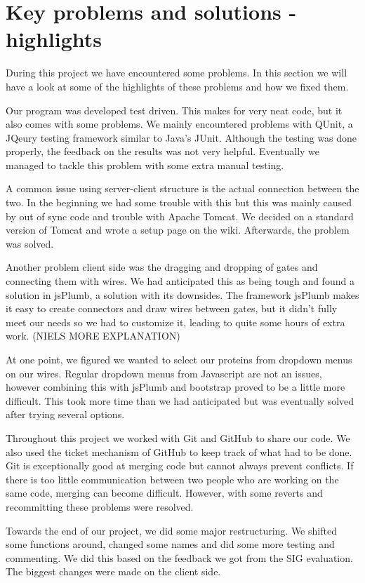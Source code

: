 \documentclass[a4paper]{article}
\begin{document}
\section{Key problems and solutions - highlights}

During this project we have encountered some problems. In this section we will have a look at some of the highlights of these problems and how we fixed them.

Our program was developed test driven. This makes for very neat code, but it also comes with some problems. We mainly encountered problems with QUnit, a JQeury testing framework similar to Java's JUnit. Although the testing was done properly, the feedback on the results was not very helpful. Eventually we managed to tackle this problem with some extra manual testing.

A common issue using server-client structure is the actual connection between the two. In the beginning we had some trouble with this but this was mainly caused by out of sync code and trouble with Apache Tomcat. We decided on a standard version of Tomcat and wrote a setup page on the wiki. Afterwards, the problem was solved.

Another problem client side was the dragging and dropping of gates and connecting them with wires. We had anticipated this as being tough and found a solution in jsPlumb, a solution with its downsides. The framework jsPlumb makes it easy to create connectors and draw wires between gates, but it didn't fully meet our needs so we had to customize it, leading to quite some hours of extra work. (NIELS MORE EXPLANATION)

At one point, we figured we wanted to select our proteins from dropdown menus on our wires. Regular dropdown menus from Javascript are not an issues, however combining this with jsPlumb and bootstrap proved to be a little more difficult. This took more time than we had anticipated but was eventually solved after trying several options.

Throughout this project we worked with Git and GitHub to share our code. We also used the ticket mechanism of GitHub to keep track of what had to be done. Git is exceptionally good at merging code but cannot always prevent conflicts. If there is too little communication between two people who are working on the same code, merging can become difficult. However, with some reverts and recommitting these problems were resolved.

Towards the end of our project, we did some major restructuring. We shifted some functions around, changed some names and did some more testing and commenting. We did this based on the feedback we got from the SIG evaluation. The biggest changes were made on the client side.
\end{document}
